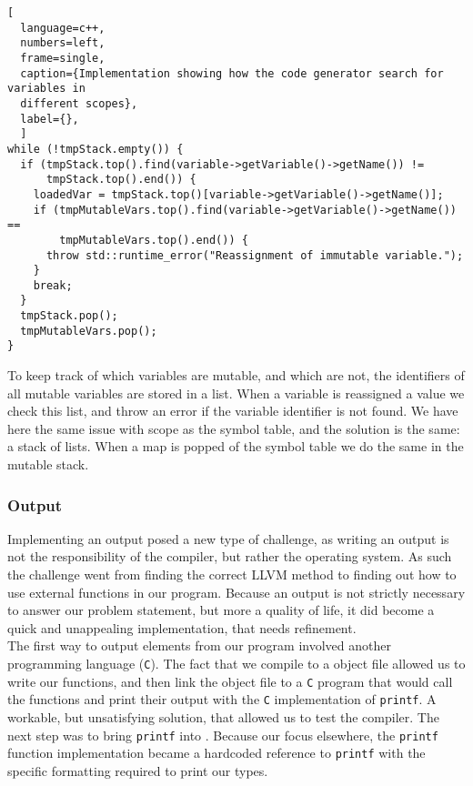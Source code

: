 \newpage 

\begin{lstlisting}[
  language=c++,
  numbers=left, 
  frame=single,
  caption={Implementation showing how the code generator search for variables in
  different scopes},
  label={},
  ]
while (!tmpStack.empty()) {
  if (tmpStack.top().find(variable->getVariable()->getName()) !=
      tmpStack.top().end()) {
    loadedVar = tmpStack.top()[variable->getVariable()->getName()];
    if (tmpMutableVars.top().find(variable->getVariable()->getName()) ==
        tmpMutableVars.top().end()) {
      throw std::runtime_error("Reassignment of immutable variable.");
    }
    break;
  }
  tmpStack.pop();
  tmpMutableVars.pop();
}
\end{lstlisting}

To keep track of which variables are mutable, and which are not, the identifiers of
all mutable variables are stored in a list. When a variable is reassigned a value we
check this list, and throw an error if the variable identifier is not found. We have
here the same issue with scope as the symbol table, and the solution is the same: a
stack of lists. When a map is popped of the symbol table we do the same in the
mutable stack.

\subsubsection{Output}
\label{sec:Output}
Implementing an output posed a new type of challenge, as writing an output is not the
responsibility of the compiler, but rather the operating system. As such the
challenge went from finding the correct LLVM method to finding out how to use
external functions in our program. Because an output is not strictly necessary to
answer our problem statement, but more a quality of life, it did become a quick and
unappealing implementation, that needs refinement.\\

The first way to output elements from our  program involved another programming
language (\texttt{C}). The fact that we compile to a object file allowed us to write our
functions, and then link the object file to a \texttt{C} program that would call the \lang{}
functions and print their output with the \texttt{C} implementation of
\texttt{printf}. A workable, but unsatisfying solution, that allowed us to test the
compiler. The next step was to bring \texttt{printf} into \lang. Because our focus
elsewhere, the \texttt{printf} function implementation became a hardcoded reference to
\texttt{printf} with the specific formatting required to print our types.\\

